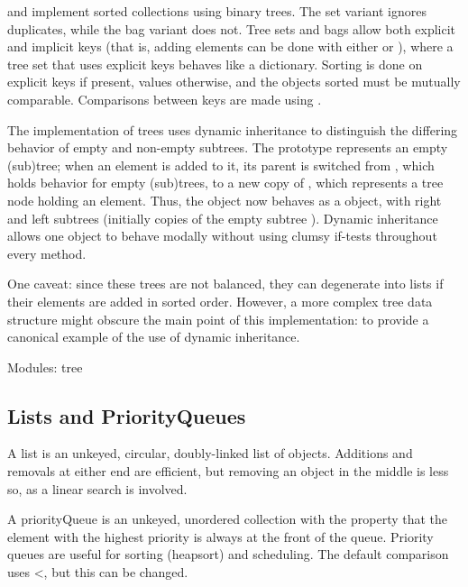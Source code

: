 \documentclass[letterpaper,10pt,english]{sphinxmanual}
\begin{document}
 and  implement sorted collections using binary trees. The set variant ignores
duplicates, while the bag variant does not. Tree sets and bags allow both explicit and implicit keys
(that is, adding elements can be done with either  or ), where a tree set that uses
explicit keys behaves like a dictionary. Sorting is done on explicit keys if present, values otherwise,
and the objects sorted must be mutually comparable. Comparisons between keys are made using
.

The implementation of trees uses dynamic inheritance to distinguish the differing behavior of empty
and non-empty subtrees. The prototype  represents an empty (sub)tree; when an element
is added to it, its parent is switched from , which holds behavior
for empty (sub)trees, to a new copy of , which represents a tree node holding an element.
Thus, the  object now behaves as a  object, with right and left subtrees
(initially copies of the empty subtree ). Dynamic inheritance allows one object to
behave modally without using clumsy if-tests throughout every method.

One caveat: since these trees are not balanced, they can degenerate into lists if their elements are
added in sorted order. However, a more complex tree data structure might obscure the main point
of this implementation: to provide a canonical example of the use of dynamic inheritance.

Modules: tree


\subsection{Lists and PriorityQueues}
\label{\detokenize{collections:lists-and-priorityqueues}}
\begin{sphinxVerbatim}[commandchars=\\\{\}]
\end{sphinxVerbatim}

A list is an unkeyed, circular, doubly-linked list of objects. Additions and removals at either end
are efficient, but removing an object in the middle is less so, as a linear search is involved.

A priorityQueue is an unkeyed, unordered collection with the property that the element with the
highest priority is always at the front of the queue. Priority queues are useful for sorting (heapsort)
and scheduling. The default comparison uses \textless{}, but this can be changed.
\end{document}

